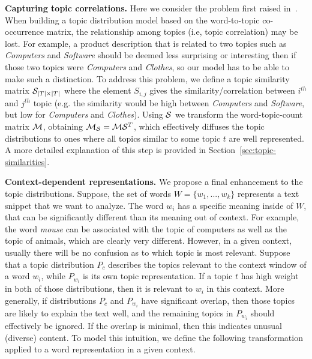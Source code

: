  {\bf Capturing topic correlations.} Here we consider the problem
first raised in~\cite{bache:2013}. When building a topic
distribution model based on the word-to-topic co-occurrence matrix,
the relationship among topics 
(i.e, topic correlation) may be lost. 
For example, a product description that is related to two
topics such as {\em Computers} and {\em Software} should be deemed
less surprising or interesting then if those two topics were {\em
  Computers} and {\em Clothes}, so our model has to be able to make
such a distinction.
To address this problem, we define a topic similarity
matrix ${\mathcal S}_{|T|\times|T|}$ 
where the element $S_{i,j}$ gives the similarity/correlation between
$i^{th}$ and $j^{th}$ topic (e.g. the similarity would be high between {\em
  Computers} and {\em Software}, but low for {\em Computers} and
{\em Clothes}). Using
${\mathcal S}$ we transform the word-topic-count matrix ${\mathcal M}$, obtaining
${\mathcal M}_{\mathcal S} = {\mathcal M}{\mathcal S}^T$, which effectively diffuses the topic
distributions to ones where all topics similar to some topic $t$ are
well represented. A more detailed explanation of this step is provided
in Section~\ref{sec:topic-similarities}.

{\bf Context-dependent representations.} We propose a final
enhancement to the topic 
distributions. Suppose, the set of words $W=\{w_1,...,w_k\}$
represents a text snippet that we want to analyze. The word $w_i$ has
a specific meaning inside of $W$, that can be significantly different
than its meaning out of context. For example, the word {\em mouse} can
be associated with the topic of computers as well as the topic of
animals, which are clearly very different. However, in a given
context, usually there will be no confusion as to which topic is
most relevant. Suppose that a topic distribution $P_c$ describes the
topics relevant to the context window of a word $w_i$, while $P_{w_i}$
is its own topic representation. If a topic $t$ has high weight in
both of those distributions, then it is relevant to $w_i$ in this
context. More generally, if distributions $P_c$ and $P_{w_i}$ have
significant overlap, then those topics are likely to explain the
text well, and the remaining topics in $P_{w_i}$ should effectively be
ignored. If the overlap is minimal, then this indicates unusual
(diverse) content. To model this intuition, we define the following
transformation applied to a word representation in a given context.

